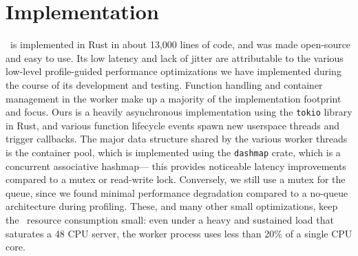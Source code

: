 \section{Implementation}
\label{sec:impl}


\sysname~is implemented in Rust in about 13,000 lines of code, and was made open-source and easy to use.
Its low latency and lack of jitter are attributable to the various low-level profile-guided performance optimizations we have implemented during the course of its development and testing.
Function handling and container management in the worker make up a majority of the implementation footprint and focus. 
Ours is a heavily asynchronous implementation using the \texttt{tokio} library in Rust, and various function lifecycle events spawn new userspace threads and trigger callbacks. 
The major data structure shared by the various worker threads is the container pool, which is implemented using the \texttt{dashmap} crate, which is a concurrent associative hashmap--- this provides noticeable latency improvements compared to a mutex or read-write lock.
Conversely, we still use a mutex for the queue, since we found minimal performance degradation compared to a no-queue architecture during profiling. 
These, and many other small optimizations, keep the \sysname~resource consumption small: even under a heavy and sustained load that saturates a 48 CPU server, the worker process uses less than 20\% of a single CPU core. 








